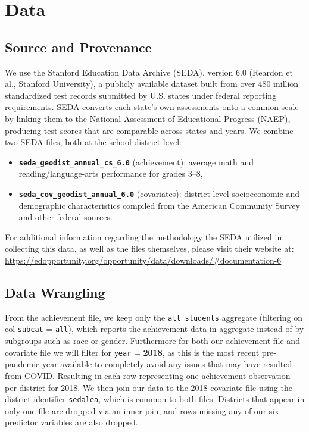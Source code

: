 \documentclass[
]{article}
\begin{document}
\section{Data}\label{data}

\subsection{Source and Provenance}\label{source-and-provenance}

We use the Stanford Education Data Archive (SEDA), version 6.0 (Reardon
et al., Stanford University), a publicly available dataset built from
over 480 million standardized test records submitted by U.S. states
under federal reporting requirements. SEDA converts each state's own
assessments onto a common scale by linking them to the National
Assessment of Educational Progress (NAEP), producing test scores that
are comparable across states and years. We combine two SEDA files, both
at the school-district level:

\begin{itemize}
\item
  \textbf{\texttt{seda\_geodist\_annual\_cs\_6.0}} (achievement):
  average math and reading/language-arts performance for grades 3--8,
\item
  \textbf{\texttt{seda\_cov\_geodist\_annual\_6.0}} (covariates):
  district-level socioeconomic and demographic characteristics compiled
  from the American Community Survey and other federal sources.
\end{itemize}

For additional information regarding the methodology the SEDA utilized
in collecting this data, as well as the files themselves, please visit
their website at:
\url{https://edopportunity.org/opportunity/data/downloads/\#documentation-6}

\subsection{Data Wrangling}\label{data-wrangling}

From the achievement file, we keep only the \texttt{all\ students}
aggregate (filtering on col \texttt{subcat} = \texttt{all}), which
reports the achievement data in aggregate instead of by subgroups such
as race or gender. Furthermore for both our achievement file and
covariate file we will filter for \texttt{year} = \textbf{2018}, as this
is the most recent pre-pandemic year available to completely avoid any
issues that may have resulted from COVID. Resulting in each row
representing one achievement observation per district for 2018. We then
join our data to the 2018 covariate file using the district identifier
\texttt{sedalea}, which is common to both files. Districts that appear
in only one file are dropped via an inner join, and rows missing any of
our six predictor variables are also dropped.
\end{document}
